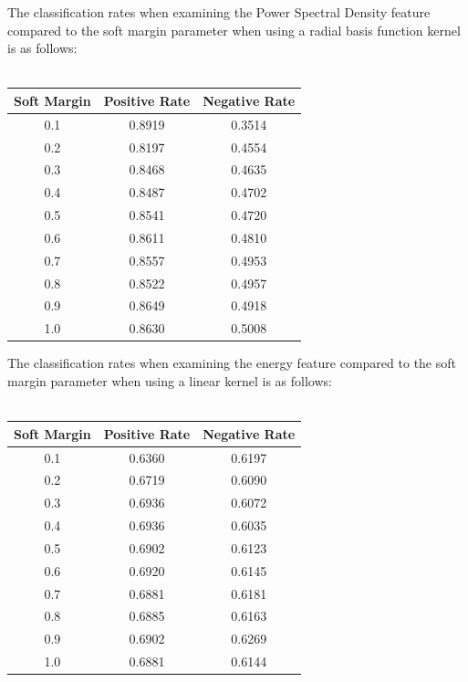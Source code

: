 \documentclass[twoside]{article}
\begin{document}
\begin{multicols}{2}
The classification rates when examining the Power Spectral Density feature
compared to the soft margin parameter when using a radial basis function kernel is as follows:\\ \\
\begin{tabular}{|c|c|c|}
	\hline
	Soft Margin 	& Positive Rate & Negative Rate \\ \hline
	0.1		& 0.8919	& 0.3514 \\ \hline
	0.2		& 0.8197	& 0.4554 \\ \hline
	0.3		& 0.8468	& 0.4635 \\ \hline
	0.4		& 0.8487	& 0.4702\\ \hline
	0.5		& 0.8541	& 0.4720\\ \hline
	0.6		& 0.8611	& 0.4810\\ \hline
	0.7		& 0.8557	& 0.4953\\ \hline
	0.8		& 0.8522	& 0.4957\\ \hline
	0.9		& 0.8649	& 0.4918\\ \hline
	1.0		& 0.8630	& 0.5008 \\ \hline
\end{tabular}



\vfill
\columnbreak



The classification rates when examining the energy feature
compared to the soft margin parameter when using a linear kernel is as follows:\\ \\
\begin{tabular}{|c|c|c|}
	\hline
	Soft Margin 	& Positive Rate & Negative Rate \\ \hline
	0.1		& 0.6360	& 0.6197 \\ \hline
	0.2		& 0.6719	& 0.6090 \\ \hline
	0.3		& 0.6936	& 0.6072 \\ \hline
	0.4		& 0.6936	& 0.6035\\ \hline
	0.5		& 0.6902	& 0.6123\\ \hline
	0.6		& 0.6920	& 0.6145\\ \hline
	0.7		& 0.6881	& 0.6181\\ \hline
	0.8		& 0.6885	& 0.6163\\ \hline
	0.9		& 0.6902	& 0.6269\\ \hline
	1.0		& 0.6881	& 0.6144 \\ \hline
\end{tabular}





\end{multicols}
\end{document}
